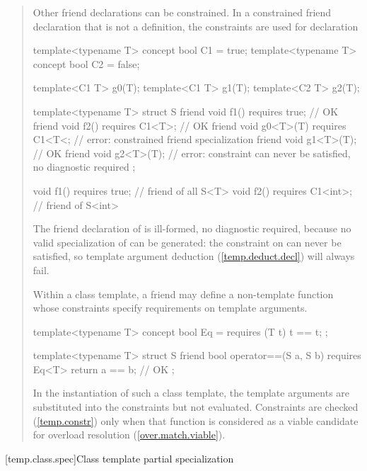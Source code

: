 \begin{quote}
\begin{addedblock}
\pnum
\enternote
Other friend declarations can be constrained. In a constrained friend 
declaration that is not a definition, the constraints are used for declaration
\exitnote
\enterexample
\begin{codeblock}
template<typename T> concept bool C1 = true;
template<typename T> concept bool C2 = false;

template<C1 T> g0(T);
template<C1 T> g1(T);
template<C2 T> g2(T);

template<typename T>
  struct S {
    friend void f1() requires true;                  // OK
    friend void f2() requires C1<T>;           // OK
    friend void g0<T>(T) requires C1<T<; // error: constrained friend specialization
    friend void g1<T>(T);                      // OK
    friend void g2<T>(T);                      // error: constraint can never be satisfied, no diagnostic required
  };

void f1() requires true;    // friend of all S<T>
void f2() requires C1<int>; // friend of S<int>
\end{codeblock}
The friend declaration of  is ill-formed, no
diagnostic required, because no valid specialization of 
can be generated: the constraint on  can never
be satisfied, so template argument deduction
(\ref{temp.deduct.decl}) will always fail.
\exitexample

\pnum
\enternote
Within a class template, a friend may define a non-template function
whose constraints specify requirements on template arguments.
\enterexample
\begin{codeblock}
template<typename T> concept bool Eq = requires (T t) { t == t; };

template<typename T>
  struct S {
    friend bool operator==(S a, S b) requires Eq<T> { return a == b; } // OK
  };
\end{codeblock}
\exitexample
In the instantiation of such a class template, the template
arguments are substituted into the constraints but not evaluated.
Constraints are checked (\ref{temp.constr}) only when
that function is considered as a viable candidate for overload resolution
(\ref{over.match.viable}).
\exitnote
\end{addedblock}
\end{quote}


[temp.class.spec]{Class template partial specialization}

